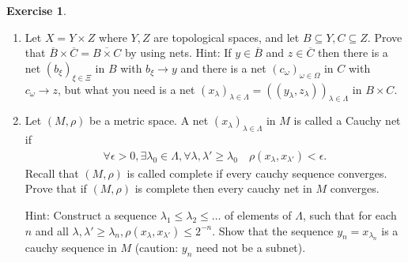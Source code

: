 \documentclass[12pt]{extarticle}
\newcommand{\<}{\langle}
\renewcommand{\>}{\rangle}
\theoremstyle{definition}
\newtheorem{exercise}{Exercise}
\begin{document}
\begin{exercise}
  \begin{enumerate}
  \item
    Let $X = Y \times Z$ where $Y,Z$ are topological spaces, and let $B \subseteq Y, C \subseteq Z$. Prove that $\overline{B} \times \overline{C}  = \overline{B \times C}$ by using nets.
    Hint: If $y \in \overline{B}$ and $z \in \overline{C}$ then there is a net $(b_\xi)_{\xi \in \Xi}$ in $B$ with $b_{\xi} \to y$ and there is a net $(c_{\omega})_{\omega \in \Omega}$ in $C$
    with $c_{\omega} \to z$, but what you need is a net $(x_{\lambda})_{\lambda \in \Lambda} = ((y_{\lambda}, z_{\lambda}))_{\lambda \in \Lambda}$ in $B \times C$.
  \item
    Let $(M, \rho)$ be a metric space. A net $(x_{\lambda})_{\lambda \in \Lambda}$ in $M$ is called a Cauchy net if
    \begin{align*}
      \forall \epsilon > 0, \exists \lambda_0 \in \Lambda, \forall \lambda, \lambda' \geq \lambda_0 \quad  \rho(x_{\lambda}, x_{\lambda'}) < \epsilon .
    \end{align*}
    Recall that $(M, \rho)$ is called complete if every cauchy sequence converges. Prove that if $(M, \rho)$ is complete then every cauchy net in $M$ converges.

    Hint: Construct a sequence $\lambda_1 \leq \lambda_2 \leq \dots$ of elements of $\Lambda$, such that for each $n$ and all $\lambda, \lambda' \geq \lambda_n, \rho(x_{\lambda}, x_{\lambda'}) \leq 2^{-n}$.
    Show that the sequence $y_n = x_{\lambda_n}$ is a cauchy sequence in $M$ (caution: $y_n$ need not be a subnet). 
  \end{enumerate}
\end{exercise}
\end{document}
